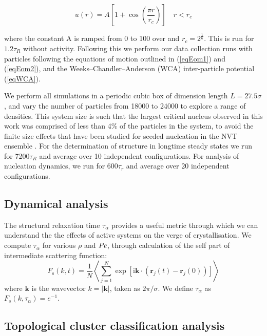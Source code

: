 \begin{equation}
u(r)=A\left[1+\cos \left(\frac{\pi r}{r_{c}}\right)\right] \quad r<r_{c}
\label{eqFatting}
\end{equation}


\noindent
where the constant A is ramped from 0 to 100 over and $r_c = 2^\frac{1}{6}$. This is run for $1.2 \tau_R$ without activity. Following this we perform our data collection runs with particles following the equations of motion outlined in (\ref{eqEom1}) and (\ref{eqEom2}), and the Weeks--Chandler--Anderson (WCA) inter-particle potential (\ref{eqWCA}). 

We perform all simulations in a periodic cubic box of dimension length $L=27.5 \sigma$, and vary the number of particles from 18000 to 24000 to explore a range of densities. 
This system size is such that the largest critical nucleus observed in this work was comprised of less than 4\% of the particles in the system, to avoid the finite size effects that have been studied for seeded nucleation in the NVT ensemble \cite{rosales-pelaez2020}.
For the determination of structure in longtime steady states we run for 7200$\tau_R$ and average over 10 independent configurations. For analysis of nucleation dynamics, we run for 600$\tau_r$ and average over 20 independent configurations.

\subsection{Dynamical analysis}
\label{sectionDynamical}


The structural relaxation time $\tau_{\alpha}$ provides a useful metric through which we can understand the the effects of active systems on the verge of crystallisation. We compute $\tau_{\alpha}$ for various $\rho$ and $\operatorname{\mathit{P\kern-.08em e}}$, through calculation of the self part of intermediate scattering function:
\begin{equation}
  	F_{\mathrm{s}}(k, t)=\frac{1}{N}\left\langle\sum_{j=1}^{N} \exp \left[\mathrm{i} \mathbf{k} \cdot\left(\mathbf{r}_{j}(t)-\mathbf{r}_{j}(0)\right)\right]\right\rangle
\end{equation}
\noindent
where $\mathbf{k}$ is the wavevector $k=|\mathbf{k}|$, taken as $2\pi/\sigma$. We define $\tau_{\alpha}$ as $F_s(k,\tau_{\alpha}) = e^{-1}$. 


\subsection{Topological cluster classification analysis}
\label{sectionTopological}



